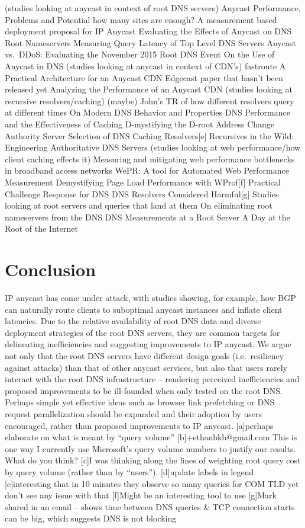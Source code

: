 \documentclass[sigconf,nonacm,10pt]{acmart}
\begin{document}
(studies looking at anycast in context of root DNS servers) Anycast
Performance, Problems and Potential how many sites are enough? A
measurement based deployment proposal for IP Anycast Evaluating the
Effects of Anycast on DNS Root Nameservers Measuring Query Latency of
Top Level DNS Servers Anycast vs.~DDoS: Evaluating the November 2015
Root DNS Event On the Use of Anycast in DNS (studies looking at anycast
in context of CDN's) fastroute A Practical Architecture for an Anycast
CDN Edgecast paper that hasn't been released yet Analyzing the
Performance of an Anycast CDN (studies looking at recursive
resolvers/caching) (maybe) John's TR of how different resolvers query at
different times On Modern DNS Behavior and Properties DNS Performance
and the Effectiveness of Caching D-mystifying the D-root Address Change
Authority Server Selection of DNS Caching Resolvers{[}e{]} Recursives in
the Wild: Engineering Authoritative DNS Servers (studies looking at web
performance/how client caching effects it) Measuring and mitigating web
performance bottlenecks in broadband access networks WePR: A tool for
Automated Web Performance Measurement Demystifying Page Load Performance
with WProf{[}f{]} Practical Challenge Response for DNS DNS Resolvers
Considered Harmful{[}g{]} Studies looking at root servers and queries
that land at them On eliminating root nameservers from the DNS DNS
Measurements at a Root Server A Day at the Root of the Internet

\fi

\section{Conclusion}\label{conclusion-1}

IP anycast has come under attack, with studies showing, for example, how
BGP can naturally route clients to suboptimal anycast instances and
inflate client latencies. Due to the relative availability of root DNS
data and diverse deployment strategies of the root DNS servers, they are
common targets for delineating inefficiencies and suggesting
improvements to IP anycast. We argue not only that the root DNS servers
have different design goals (i.e.~resiliency against attacks) than that
of other anycast services, but also that users rarely interact with the
root DNS infrastructure -- rendering perceived inefficiencies and
proposed improvements to be ill-founded when only tested on the root
DNS. Perhaps simple yet effective ideas such as browser link prefetching
or DNS request parallelization should be expanded and their adoption by
users encouraged, rather than proposed improvements to IP anycast.
{[}a{]}perhaps elaborate on what is meant by ``query volume''
{[}b{]}+ethanbkb@gmail.com This is one way I currently use Microsoft's
query volume numbers to justify our results. What do you think? {[}c{]}I
was thinking along the lines of weighting root query cost by query
volume (rather than by ``users''). {[}d{]}update labels in legend
{[}e{]}interesting that in 10 minutes they observe so many queries for
COM TLD yet don't see any issue with that {[}f{]}Might be an interesting
tool to use {[}g{]}Mark shared in an email -- shows time between DNS
queries \& TCP connection starts can be big, which suggests DNS is not
blocking


\end{document}
